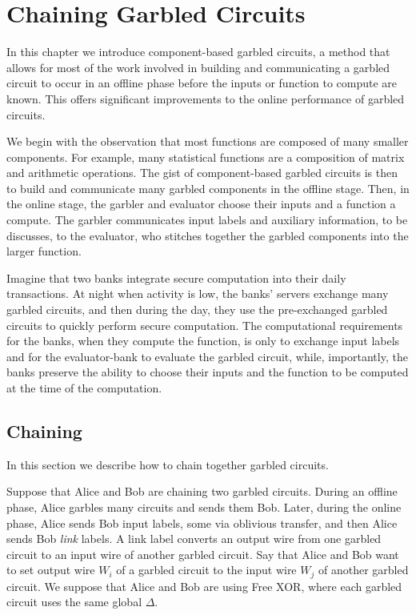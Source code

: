 
\chapter{Chaining Garbled Circuits}

In this chapter we introduce component-based garbled circuits, a method that allows for most of the work involved in building and communicating a garbled circuit to occur in an offline phase before the inputs or function to compute are known. 
This offers significant improvements to the online performance of garbled circuits. 

We begin with the observation that most functions are composed of many smaller components. 
For example, many statistical functions are a composition of matrix and arithmetic operations.
The gist of component-based garbled circuits is then to build and communicate many garbled components in the offline stage. 
Then, in the online stage, the garbler and evaluator choose their inputs and a function a compute. 
The garbler communicates input labels and auxiliary information, to be discusses, to the evaluator, who stitches together the garbled components into the larger function.

Imagine that two banks integrate secure computation into their daily transactions.
At night when activity is low, the banks' servers exchange many garbled circuits, and then during the day, they use the pre-exchanged garbled circuits to quickly perform secure computation.
The computational requirements for the banks, when they compute the function, is only to exchange input labels and for the evaluator-bank to evaluate the garbled circuit, while, importantly, the banks preserve the ability to choose their inputs and the function to be computed at the time of the computation. 

\section{Chaining}


In this section we describe how to chain together garbled circuits.


Suppose that Alice and Bob are chaining two garbled circuits.
During an offline phase, Alice garbles many circuits and sends them Bob.
Later, during the online phase, Alice sends Bob input labels, some via oblivious transfer, and then Alice sends Bob \textit{link} labels.
A link label converts an output wire from one garbled circuit to an input wire of another garbled circuit.
Say that Alice and Bob want to set output wire $W_i$ of a garbled circuit to the input wire $W_j$ of another garbled circuit.
We suppose that Alice and Bob are using Free XOR, where each garbled circuit uses the same global $\Delta$.

